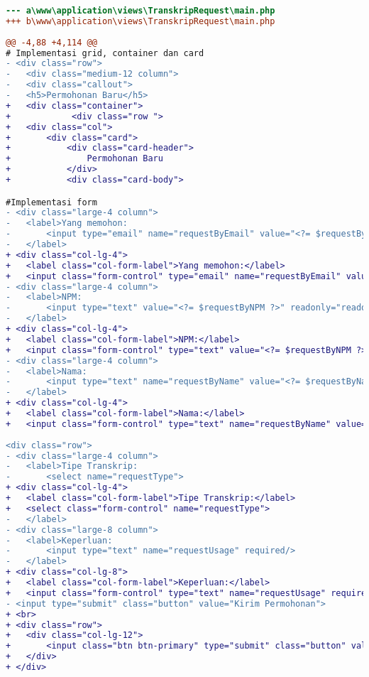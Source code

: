 \begin{lstlisting}[language=diff, caption=Perubahan file \path{\views\TranskripRequest\main.php} ,  basicstyle=\ttfamily, frame=single,
columns=fullflexible, keepspaces=true, breaklines=true, label={lst:mainTranskripRequest}]
--- a\www\application\views\TranskripRequest\main.php
+++ b\www\application\views\TranskripRequest\main.php
 
@@ -4,88 +4,114 @@
# Implementasi grid, container dan card
- <div class="row">
- 	<div class="medium-12 column">
- 	<div class="callout">
- 	<h5>Permohonan Baru</h5>
+ 	<div class="container">
+            <div class="row ">
+ 	<div class="col">
+ 		<div class="card">
+ 			<div class="card-header">
+ 				Permohonan Baru
+ 			</div>
+ 			<div class="card-body">

#Implementasi form
- <div class="large-4 column">
- 	<label>Yang memohon:
- 		<input type="email" name="requestByEmail" value="<?= $requestByEmail ?>" readonly="readonly"/>
- 	</label>
+ <div class="col-lg-4">
+ 	<label class="col-form-label">Yang memohon:</label>
+ 	<input class="form-control" type="email" name="requestByEmail" value="<?= $requestByEmail ?>" readonly/>
- <div class="large-4 column">
- 	<label>NPM:
- 		<input type="text" value="<?= $requestByNPM ?>" readonly="readonly"/>
- 	</label>
+ <div class="col-lg-4">
+ 	<label class="col-form-label">NPM:</label>
+ 	<input class="form-control" type="text" value="<?= $requestByNPM ?>" readonly/>
- <div class="large-4 column">
- 	<label>Nama:
- 		<input type="text" name="requestByName" value="<?= $requestByName ?>" readonly="readonly"/>
- 	</label>
+ <div class="col-lg-4">
+ 	<label class="col-form-label">Nama:</label>
+ 	<input class="form-control" type="text" name="requestByName" value="<?= $requestByName ?>" readonly/>
 
<div class="row">
- <div class="large-4 column">
- 	<label>Tipe Transkrip:
- 		<select name="requestType">
+ <div class="col-lg-4">
+ 	<label class="col-form-label">Tipe Transkrip:</label>
+ 	<select class="form-control" name="requestType">
- 	</label>
- <div class="large-8 column">
- 	<label>Keperluan:
- 		<input type="text" name="requestUsage" required/>
- 	</label>
+ <div class="col-lg-8">
+ 	<label class="col-form-label">Keperluan:</label>
+ 	<input class="form-control" type="text" name="requestUsage" required/>
- <input type="submit" class="button" value="Kirim Permohonan">
+ <br>
+ <div class="row">
+ 	<div class="col-lg-12">
+ 		<input class="btn btn-primary" type="submit" class="button" value="Kirim Permohonan">
+ 	</div>
+ </div>


\end{lstlisting}
